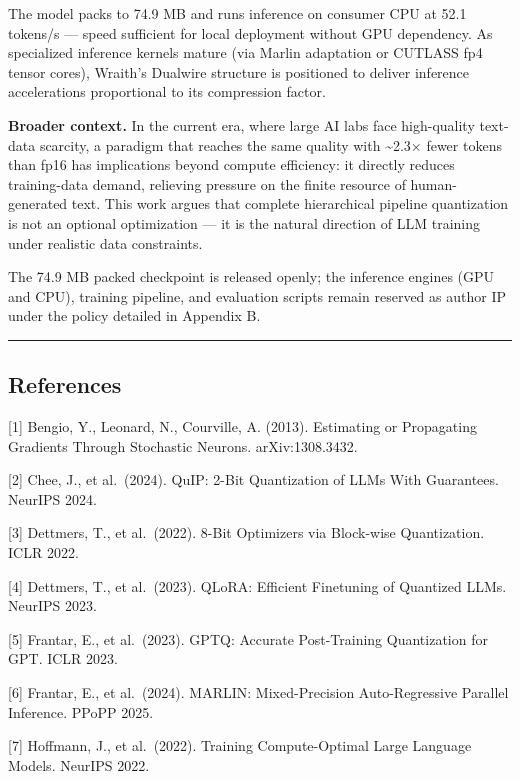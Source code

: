 The model packs to 74.9 MB and runs inference on consumer CPU at 52.1
tokens/s --- speed sufficient for local deployment without GPU
dependency. As specialized inference kernels mature (via Marlin
adaptation or CUTLASS fp4 tensor cores), Wraith's Dualwire structure is
positioned to deliver inference accelerations proportional to its
compression factor.

\textbf{Broader context.} In the current era, where large AI labs face
high-quality text-data scarcity, a paradigm that reaches the same
quality with \textasciitilde2.3× fewer tokens than fp16 has implications
beyond compute efficiency: it directly reduces training-data demand,
relieving pressure on the finite resource of human-generated text. This
work argues that complete hierarchical pipeline quantization is not an
optional optimization --- it is the natural direction of LLM training
under realistic data constraints.

The 74.9 MB packed checkpoint is released openly; the inference engines
(GPU and CPU), training pipeline, and evaluation scripts remain reserved
as author IP under the policy detailed in Appendix B.

\begin{center}\rule{0.5\linewidth}{0.5pt}\end{center}

\subsection{References}\label{references}

{[}1{]} Bengio, Y., Leonard, N., Courville, A. (2013). Estimating or
Propagating Gradients Through Stochastic Neurons. arXiv:1308.3432.

{[}2{]} Chee, J., et al.~(2024). QuIP: 2-Bit Quantization of LLMs With
Guarantees. NeurIPS 2024.

{[}3{]} Dettmers, T., et al.~(2022). 8-Bit Optimizers via Block-wise
Quantization. ICLR 2022.

{[}4{]} Dettmers, T., et al.~(2023). QLoRA: Efficient Finetuning of
Quantized LLMs. NeurIPS 2023.

{[}5{]} Frantar, E., et al.~(2023). GPTQ: Accurate Post-Training
Quantization for GPT. ICLR 2023.

{[}6{]} Frantar, E., et al.~(2024). MARLIN: Mixed-Precision
Auto-Regressive Parallel Inference. PPoPP 2025.

{[}7{]} Hoffmann, J., et al.~(2022). Training Compute-Optimal Large
Language Models. NeurIPS 2022.

